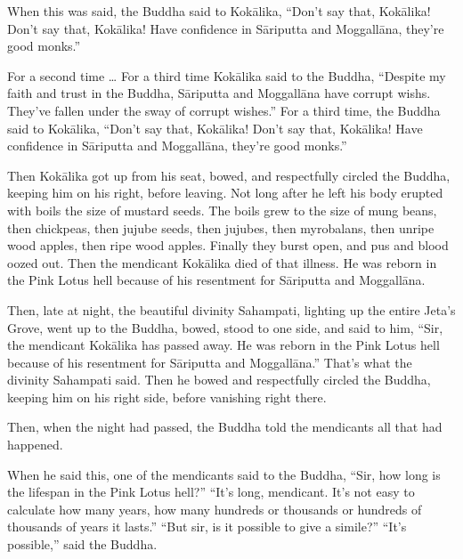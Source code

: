 \documentclass[12pt,openany]{book}%
\begin{document}
When this was said, the Buddha said to \textsanskrit{Kokālika}, “Don’t say that, \textsanskrit{Kokālika}! Don’t say that, \textsanskrit{Kokālika}! Have confidence in \textsanskrit{Sāriputta} and \textsanskrit{Moggallāna}, they’re good monks.” 

For a second time … For a third time \textsanskrit{Kokālika} said to the Buddha, “Despite my faith and trust in the Buddha, \textsanskrit{Sāriputta} and \textsanskrit{Moggallāna} have corrupt wishs. They’ve fallen under the sway of corrupt wishes.” For a third time, the Buddha said to \textsanskrit{Kokālika}, “Don’t say that, \textsanskrit{Kokālika}! Don’t say that, \textsanskrit{Kokālika}! Have confidence in \textsanskrit{Sāriputta} and \textsanskrit{Moggallāna}, they’re good monks.” 

Then \textsanskrit{Kokālika} got up from his seat, bowed, and respectfully circled the Buddha, keeping him on his right, before leaving. Not long after he left his body erupted with boils the size of mustard seeds. The boils grew to the size of mung beans, then chickpeas, then jujube seeds, then jujubes, then myrobalans, then unripe wood apples, then ripe wood apples. Finally they burst open, and pus and blood oozed out. Then the mendicant \textsanskrit{Kokālika} died of that illness. He was reborn in the Pink Lotus hell because of his resentment for \textsanskrit{Sāriputta} and \textsanskrit{Moggallāna}. 

Then, late at night, the beautiful divinity Sahampati, lighting up the entire Jeta’s Grove, went up to the Buddha, bowed, stood to one side, and said to him, “Sir, the mendicant \textsanskrit{Kokālika} has passed away. He was reborn in the Pink Lotus hell because of his resentment for \textsanskrit{Sāriputta} and \textsanskrit{Moggallāna}.” That’s what the divinity Sahampati said. Then he bowed and respectfully circled the Buddha, keeping him on his right side, before vanishing right there. 

Then, when the night had passed, the Buddha told the mendicants all that had happened. 

When he said this, one of the mendicants said to the Buddha, “Sir, how long is the lifespan in the Pink Lotus hell?” “It’s long, mendicant. It’s not easy to calculate how many years, how many hundreds or thousands or hundreds of thousands of years it lasts.” “But sir, is it possible to give a simile?” “It’s possible,” said the Buddha. 
\end{document}
